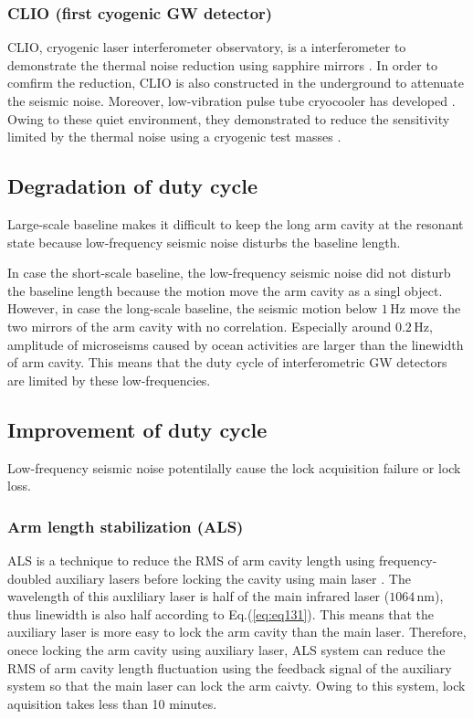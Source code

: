 \subsubsection{CLIO (first cyogenic GW detector)}
CLIO, cryogenic laser interferometer observatory, is a interferometer to demonstrate the thermal noise reduction using sapphire mirrors \cite{ohashi2003design}. In order to comfirm the reduction, CLIO is also constructed in the underground to attenuate the seismic noise. Moreover, low-vibration pulse tube cryocooler has developed \cite{tomaru2004development}. Owing to these quiet environment, they demonstrated to reduce the sensitivity limited by the thermal noise using a cryogenic test masses \cite{uchiyama2012reduction}.


\newpage
\subsection{Degradation of duty cycle }
Large-scale baseline makes it difficult to keep the long arm cavity at the resonant state because low-frequency seismic noise disturbs the baseline length.

In case the short-scale baseline, the low-frequency seismic noise did not disturb the baseline length because the motion move the arm cavity as a singl object. However, in case the long-scale baseline, the seismic motion below $1\,\mathrm{Hz}$ move the two mirrors of the arm cavity with no correlation. Especially around $0.2\,\mathrm{Hz}$, amplitude of microseisms caused by ocean activities are larger than the linewidth of arm cavity. This means that the duty cycle of interferometric GW detectors are limited by these low-frequencies.

\subsection{Improvement of duty cycle}
Low-frequency seismic noise potentilally cause the lock acquisition failure or lock loss. 

\subsubsection{Arm length stabilization (ALS)}
ALS is a technique to reduce the RMS of arm cavity length using frequency-doubled auxiliary lasers before locking the cavity using main laser \cite{mullavey2012arm,izumi2012multi}. The wavelength of this auxliliary laser is half of the main infrared laser ($1064\,\mathrm{nm}$), thus linewidth is also half according to Eq.(\ref{eq:eq131}). This means that the auxiliary laser is more easy to lock the arm cavity than the main laser. Therefore, onece locking the arm cavity using auxiliary laser, ALS system can reduce the RMS of arm cavity length fluctuation using the feedback signal of the auxiliary system so that the main laser can lock the arm caivty. Owing to this system, lock aquisition takes less than 10 minutes.

